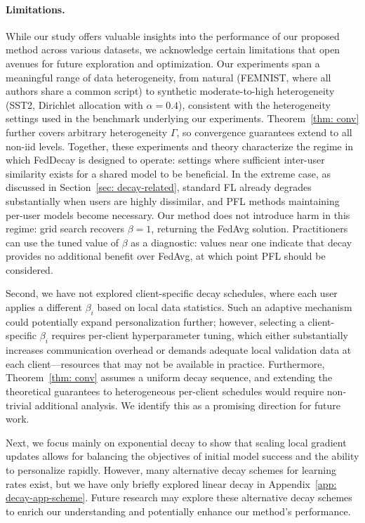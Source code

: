 \paragraph{Limitations.}
While our study offers valuable insights into the performance of our proposed method across various datasets, we acknowledge certain limitations that open avenues for future exploration and optimization.
Our experiments span a meaningful range of data heterogeneity, from natural (FEMNIST, where all authors share a common script) to synthetic moderate-to-high heterogeneity (SST2, Dirichlet allocation with $\alpha = 0.4$), consistent with the heterogeneity settings used in the benchmark underlying our experiments.
Theorem~\ref{thm: conv} further covers arbitrary heterogeneity $\Gamma$, so convergence guarantees extend to all non-iid levels.
Together, these experiments and theory characterize the regime in which FedDecay is designed to operate: settings where sufficient inter-user similarity exists for a shared model to be beneficial.
In the extreme case, as discussed in Section~\ref{sec: decay-related}, standard FL already degrades substantially when users are highly dissimilar, and PFL methods maintaining per-user models become necessary.
Our method does not introduce harm in this regime: grid search recovers $\beta = 1$, returning the FedAvg solution.
Practitioners can use the tuned value of $\beta$ as a diagnostic: values near one indicate that decay provides no additional benefit over FedAvg, at which point PFL should be considered.

Second, we have not explored client-specific decay schedules, where each user applies a different $\beta_i$ based on local data statistics.
Such an adaptive mechanism could potentially expand personalization further; however, selecting a client-specific $\beta_i$ requires per-client hyperparameter tuning, which either substantially increases communication overhead or demands adequate local validation data at each client---resources that may not be available in practice.
Furthermore, Theorem~\ref{thm: conv} assumes a uniform decay sequence, and extending the theoretical guarantees to heterogeneous per-client schedules would require non-trivial additional analysis.
We identify this as a promising direction for future work.

Next, we focus mainly on exponential decay to show that scaling local gradient updates allows for balancing the objectives of initial model success and the ability to personalize rapidly.
However, many alternative decay schemes for learning rates exist, but we have only briefly explored linear decay in Appendix~\ref{app: decay-app-scheme}.
Future research may explore these alternative decay schemes to enrich our understanding and potentially enhance our method's performance.

